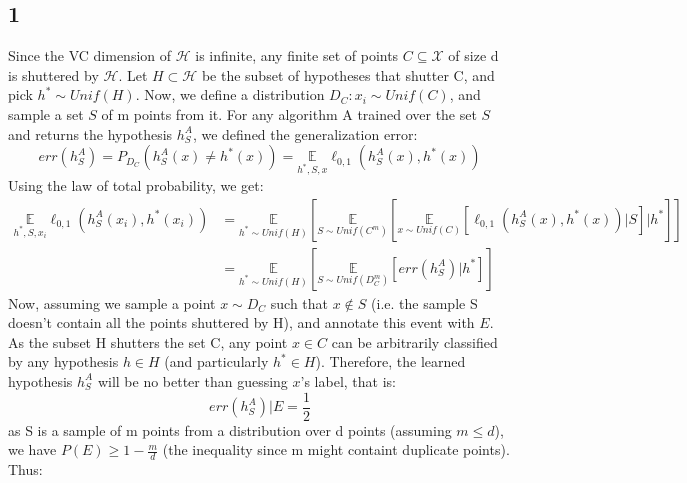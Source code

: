 \subsection*{1}
Since the VC dimension of $\mathcal{H}$ is infinite, any finite set of points $C \subseteq \mathcal{X} $ of size d is shuttered by $\mathcal{H}$. Let $H \subset \mathcal{H}$ be the subset of hypotheses that shutter C, and pick $h^* \sim Unif(H)$. Now, we define a distribution $D_C: x_i \sim Unif(C)$, and sample a set $S$ of m points from it. For any algorithm A trained over the set $S$ and returns the hypothesis $h_S^A$, we defined the generalization error:
\begin{equation*}
    err(h_S^A) = P_{D_C}(h_S^A(x) \neq h^*(x)) = \underset{h^*, S, x}{\mathbb{E}} \ell_{0,1}(h_S^A(x),h^*(x))
\end{equation*}
Using the law of total probability, we get:
\begin{equation*}
    \begin{split}        
        \underset{h^*, S, x_i}{\mathbb{E}} \ell_{0,1}(h_S^A(x_i),h^*(x_i)) &= \underset{h^* \sim Unif(H)}{\mathbb{E}} \left[\underset{S \sim Unif(C^m)}{\mathbb{E}} \left[\underset{x \sim Unif(C)}{\mathbb{E}} \left[\ell_{0,1}(h_S^A(x),h^*(x)) | S \right] | h^* \right] \right] \\
         &= \underset{h^* \sim Unif(H)}{\mathbb{E}} \left[\underset{S \sim Unif(D_C^m)}{\mathbb{E}}  \left[ err(h_S^A) | h^* \right] \right]
    \end{split}
\end{equation*}
Now, assuming we sample a point $x \sim D_C$ such that $x \notin S$ (i.e. the sample S doesn't contain all the points shuttered by H), and annotate this event with $E$. As the subset H shutters the set C, any point $x\in C$ can be arbitrarily classified by any hypothesis $h \in H$ (and particularly $h^*\in H$). Therefore, the learned hypothesis $h_S^A$ will be no better than guessing $x$'s label, that is:
\begin{equation*}
    err(h_S^A) | E = \frac{1}{2}
\end{equation*}
as S is a sample of m points from a distribution over d points (assuming $m \leq d$), we have $P(E) \geq 1 - \frac{m}{d}$ (the inequality since m might containt duplicate points). Thus:


